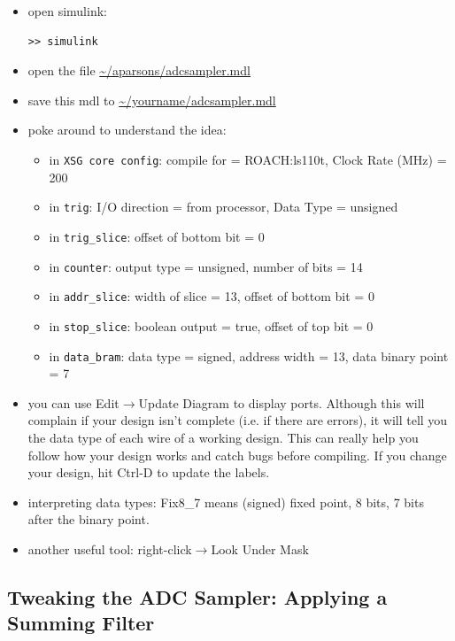 \documentclass[11pt]{article}
\begin{document}
\begin{itemize}
\item open simulink:
\begin{verbatim}
>> simulink
\end{verbatim}
\item open the file \url{~/aparsons/adcsampler.mdl}
\item save this mdl to \url{~/yourname/adcsampler.mdl}
\item poke around to understand the idea:
\begin{itemize}
\item in {\tt XSG core config}: compile for = ROACH:ls110t, Clock Rate (MHz) = 200
\item in {\tt trig}: I/O direction = from processor, Data Type = unsigned
\item in {\tt trig\_slice}: offset of bottom bit = 0
\item in {\tt counter}: output type = unsigned, number of bits = 14 
\item in {\tt addr\_slice}: width of slice = 13, offset of bottom bit = 0
\item in {\tt stop\_slice}: boolean output = true, offset of top bit = 0
\item in {\tt data\_bram}: data type = signed, address width = 13, data binary point = 7
\end{itemize}
\item you can use Edit$\to$Update Diagram to display ports.
Although this will complain
if your design isn't complete (i.e. if there are errors), it will tell you the data
type of each wire of a working design.  This can really help you follow how your
design works and catch bugs before compiling.  If you change your design, hit Ctrl-D
to update the labels.
\item interpreting data types: Fix8\_7 means (signed) fixed point, 8 bits, 7 bits after the binary point.
\item another useful tool: right-click$\to$Look Under Mask
\end{itemize}

\subsection{Tweaking the ADC Sampler: Applying a Summing Filter}
\end{document}
